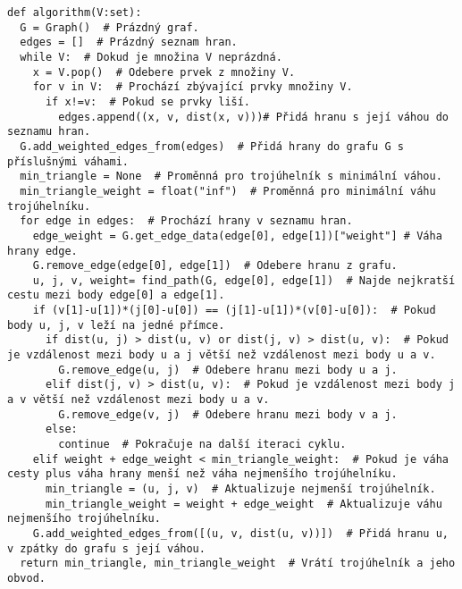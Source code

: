 \begin{mdframed}[style=MyFrame]
\begin{lstlisting}[style=metoo]
def algorithm(V:set):
  G = Graph()  # Prázdný graf.
  edges = []  # Prázdný seznam hran.
  while V:  # Dokud je množina V neprázdná.
    x = V.pop()  # Odebere prvek z množiny V.
    for v in V:  # Prochází zbývající prvky množiny V.
      if x!=v:  # Pokud se prvky liší.
        edges.append((x, v, dist(x, v)))# Přidá hranu s její váhou do seznamu hran.
  G.add_weighted_edges_from(edges)  # Přidá hrany do grafu G s příslušnými váhami.
  min_triangle = None  # Proměnná pro trojúhelník s minimální váhou.
  min_triangle_weight = float("inf")  # Proměnná pro minimální váhu trojúhelníku.
  for edge in edges:  # Prochází hrany v seznamu hran.
    edge_weight = G.get_edge_data(edge[0], edge[1])["weight"] # Váha hrany edge.
    G.remove_edge(edge[0], edge[1])  # Odebere hranu z grafu.
    u, j, v, weight= find_path(G, edge[0], edge[1])  # Najde nejkratší cestu mezi body edge[0] a edge[1].
    if (v[1]-u[1])*(j[0]-u[0]) == (j[1]-u[1])*(v[0]-u[0]):  # Pokud body u, j, v leží na jedné přímce.
      if dist(u, j) > dist(u, v) or dist(j, v) > dist(u, v):  # Pokud je vzdálenost mezi body u a j větší než vzdálenost mezi body u a v.
        G.remove_edge(u, j)  # Odebere hranu mezi body u a j.
      elif dist(j, v) > dist(u, v):  # Pokud je vzdálenost mezi body j a v větší než vzdálenost mezi body u a v.
        G.remove_edge(v, j)  # Odebere hranu mezi body v a j.
      else:
        continue  # Pokračuje na další iteraci cyklu.
    elif weight + edge_weight < min_triangle_weight:  # Pokud je váha cesty plus váha hrany menší než váha nejmenšího trojúhelníku.
      min_triangle = (u, j, v)  # Aktualizuje nejmenší trojúhelník.
      min_triangle_weight = weight + edge_weight  # Aktualizuje váhu nejmenšího trojúhelníku.
    G.add_weighted_edges_from([(u, v, dist(u, v))])  # Přidá hranu u, v zpátky do grafu s její váhou.
  return min_triangle, min_triangle_weight  # Vrátí trojúhelník a jeho obvod.
\end{lstlisting}
\end{mdframed}